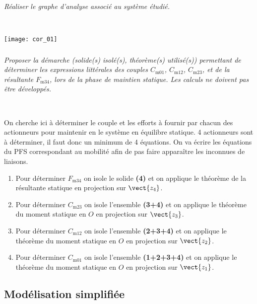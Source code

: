 \subparagraph{}
\textit{Réaliser le graphe d'analyse associé au système étudié.}
\ifprof
\begin{corrige}~\\

\begin{center} 
\texttt{[image: cor\_01]}
\end{center}

\end{corrige}
\else
\fi
\subparagraph{}
\textit{Proposer la démarche (solide(s) isolé(s), théorème(s) utilisé(s)) permettant de déterminer les expressions littérales des couples $C_{\text{m01}}$, $C_{\text{m12}}$, $C_{\text{m23}}$,  et de la résultante $F_{\text{m34}}$,  lors de la phase de
maintien statique. Les calculs ne doivent pas être développés.}
\ifprof
\begin{corrige} ~\\

\begin{methode}
On cherche ici à déterminer le couple et les efforts à fournir par chacun des actionneurs pour maintenir en le système en équilibre statique. 4 actionneurs sont à déterminer, il faut donc un minimum de 4 équations. On va écrire les équations du PFS correspondant au mobilité afin de pas faire apparaître les inconnues de liaisons.   
\end{methode}

\begin{enumerate}
\item Pour déterminer $F_{\text{m34}}$ on isole le solide \textbf{(4)} et on applique le théorème de la résultante statique en projection sur $\vect{z_4}$.
\item Pour déterminer $C_{\text{m23}}$ on isole l'ensemble \textbf{(3+4)} et on applique le théorème du moment statique en $O$ en projection sur $\vect{z_3}$.
\item Pour déterminer $C_{\text{m12}}$ on isole l'ensemble \textbf{(2+3+4)} et on applique le théorème du moment statique en $O$ en projection sur $\vect{z_2}$.
\item Pour déterminer $C_{\text{m01}}$ on  isole l'ensemble \textbf{(1+2+3+4)} et on applique le théorème du moment statique en $O$ en projection sur $\vect{z_1}$.
\end{enumerate}
\end{corrige}
\else
\fi

 
 \subsection*{Modélisation simplifiée}
 
